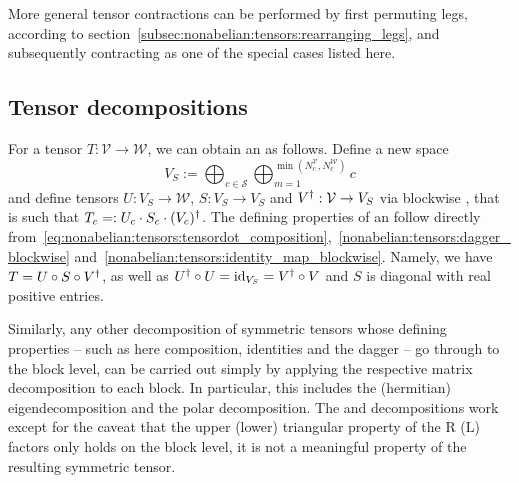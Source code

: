 More general tensor contractions can be performed by first permuting legs, according to section~\ref{subsec:nonabelian:tensors:rearranging_legs}, and subsequently contracting as one of the special cases listed here.

\subsection{Tensor decompositions}
\label{subsec:nonabelian:tensors:decomposition}

For a tensor $T: \mathcal{V} \to \mathcal{W}$, we can obtain an  as follows.
%
Define a new space
\begin{equation}
    V_S := \bigoplus_{c\in\mathcal{S}} \bigoplus_{m=1}^{\min(N^\mathcal{V}_c, N^\mathcal{W}_c)} c
\end{equation}
and define tensors $U: V_S \to \mathcal{W}$, $S: V_S \to V_S$ and $V^\dagger: \mathcal{V} \to V_S$
via blockwise , that is such that $T_c =: U_c \cdot S_c \cdot (V_c)^\dagger$.
%
The defining properties of an  follow directly from~\eqref{eq:nonabelian:tensors:tensordot_composition},~\eqref{nonabelian:tensors:dagger_blockwise} and~\eqref{nonabelian:tensors:identity_map_blockwise}.
%
Namely, we have $T = U \circ S \circ V^\dagger$, as well as $U^\dagger \circ U = \mathrm{id}_{V_S} = V^\dagger \circ V$ and $S$ is diagonal with real positive entries.

Similarly, any other decomposition of symmetric tensors whose defining properties -- such as here composition, identities and the dagger -- go through to the block level, can be carried out simply by applying the respective matrix decomposition to each block.
%
In particular, this includes the (hermitian) eigendecomposition and the polar decomposition.
%
The  and  decompositions work except for the caveat that the upper (lower) triangular property of the R (L) factors only holds on the block level, it is not a meaningful property of the resulting symmetric tensor.

